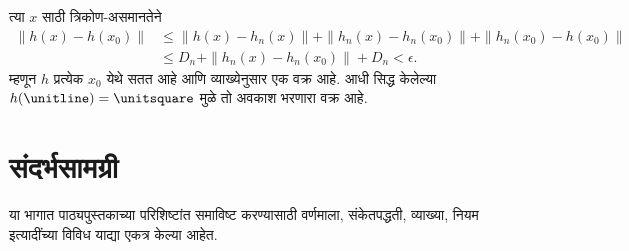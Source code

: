 त्या $x$ साठी त्रिकोण-असमानतेने
\begin{align*}
\|h(x)-h(x_0)\|
&\leq\|h(x)-h_n(x)\|+\|h_n(x)-h_n(x_0)\|
+\|h_n(x_0)-h(x_0)\|\\
&\leq D_n+\|h_n(x)-h_n(x_0)\|+D_n
<\epsilon.
\end{align*}
म्हणून $h$ प्रत्येक $x_0$ येथे सतत आहे आणि व्याख्येनुसार
एक वक्र आहे. आधी सिद्ध केलेल्या
$h(\unitline)=\unitsquare$ मुळे तो अवकाश भरणारा वक्र आहे.





\part{संदर्भसामग्री}\label{ref:part}
\begin{editorial}
  या भागात पाठ्यपुस्तकाच्या परिशिष्टांत समाविष्ट करण्यासाठी वर्णमाला,
  संकेतपद्धती, व्याख्या, नियम इत्यादींच्या विविध याद्या एकत्र केल्या आहेत.
\end{editorial}
